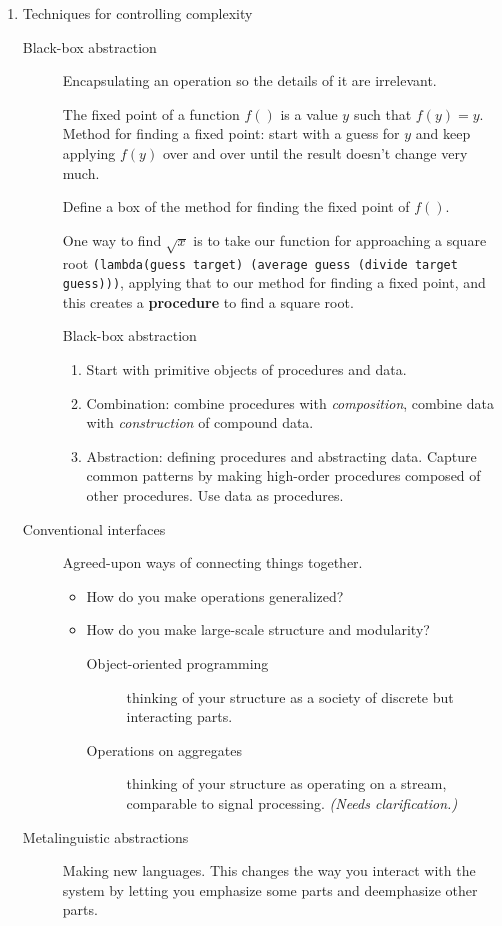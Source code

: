 \documentclass[final,fleqn,titlepage,twoside]{article}
\begin{document}
\begin{enumerate}
\item Techniques for controlling complexity
\label{sec:org8f9de2e}
\begin{description}
\item[{Black-box abstraction}] Encapsulating an operation so the details of it are
irrelevant.

The fixed point of a function \(f()\) is a value \(y\) such that \(f(y) = y\).
Method for finding a fixed point: start with a guess for \(y\) and keep applying
\(f(y)\) over and over until the result doesn't change very much.

Define a box of the method for finding the fixed point of \(f()\).

One way to find \(\sqrt{x}\) is to take our function for approaching a square
root \texttt{(lambda(guess target) (average guess (divide target guess)))}, applying
that to our method for finding a fixed point, and this creates a \textbf{procedure} to
find a square root.

Black-box abstraction
\begin{enumerate}
\item Start with primitive objects of procedures and data.
\item Combination: combine procedures with \emph{composition}, combine data with
\emph{construction} of compound data.
\item Abstraction: defining procedures and abstracting data. Capture common
patterns by making high-order procedures composed of other procedures. Use
data as procedures.
\end{enumerate}

\item[{Conventional interfaces}] Agreed-upon ways of connecting things together.

\begin{itemize}
\item How do you make operations generalized?
\item How do you make large-scale structure and modularity?
\begin{description}
\item[{Object-oriented programming}] thinking of your structure as a society of
discrete but interacting parts.
\item[{Operations on aggregates}] thinking of your structure as operating on a
stream, comparable to signal processing. \emph{(Needs clarification.)}
\end{description}
\end{itemize}

\item[{Metalinguistic abstractions}] Making new languages. This changes the way you
interact with the system by letting you emphasize some parts and deemphasize
other parts.
\end{description}
\end{enumerate}
\end{document}
